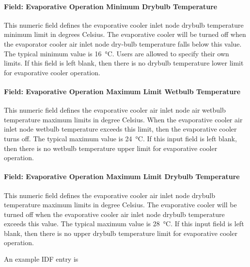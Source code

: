 \paragraph{Field: Evaporative Operation Minimum Drybulb Temperature}\label{field-evaporative-cooler-operation-minimum-drybulb-temperature}

This numeric field defines the evaporative cooler inlet node drybulb temperature minimum limit in degrees Celsius. The evaporative cooler will be turned off when the evaporator cooler air inlet node dry-bulb temperature falls below this value. The typical minimum value is \SI{16}{\celsius}. Users are allowed to specify their own limits. If this field is left blank, then there is no drybulb temperature lower limit for evaporative cooler operation.

\paragraph{Field: Evaporative Operation Maximum Limit Wetbulb Temperature}\label{field-evaporative-operation-maximum-limit-wetbulb-temperature}

This numeric field defines the evaporative cooler air inlet node air wetbulb temperature maximum limits in degree Celsius. When the evaporative cooler air inlet node wetbulb temperature exceeds this limit, then the evaporative cooler turns off. The typical maximum value is \SI{24}{\celsius}. If this input field is left blank, then there is no wetbulb temperature upper limit for evaporative cooler operation.

\paragraph{Field: Evaporative Operation Maximum Limit Drybulb Temperature}\label{field-evaporative-operation-maximum-limit-drybulb-temperature}

This numeric field defines the evaporative cooler air inlet node drybulb temperature maximum limits in degree Celsius. The evaporative cooler will be turned off when the evaporative cooler air inlet node drybulb temperature exceeds this value. The typical maximum value is \SI{28}{\celsius}. If this input field is left blank, then there is no upper drybulb temperature limit for evaporative cooler operation.

An example IDF entry is

